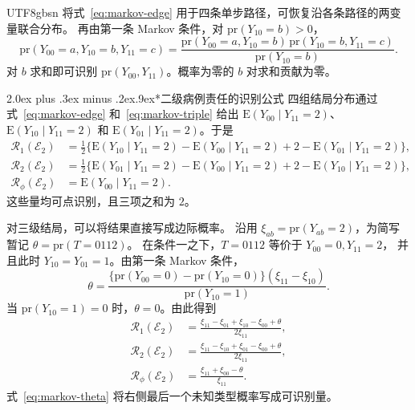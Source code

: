 \documentclass[11pt,a4paper]{article}
\makeatletter
\newcommand{\headingweight}{\ifPDFTeX\mdseries\else\bfseries\fi}
\renewcommand{\section}{\@startsection{section}{1}{0pt}
  {2.0ex plus .3ex minus .2ex}{.9ex}{\normalfont\large\headingweight}}
\makeatother
\begin{document}
\begin{CJK*}{UTF8}{gbsn}
将式~\eqref{eq:markov-edge} 用于四条单步路径，可恢复沿各条路径的两变量联合分布。
再由第一条 Markov 条件，对 $\mathrm{pr}(Y_{10}=b)>0$，
\begin{equation}
\mathrm{pr}(Y_{00}=a,Y_{10}=b,Y_{11}=c)
=
\frac{\mathrm{pr}(Y_{00}=a,Y_{10}=b)\,
      \mathrm{pr}(Y_{10}=b,Y_{11}=c)}
     {\mathrm{pr}(Y_{10}=b)} .
\label{eq:markov-triple}
\end{equation}
对 $b$ 求和即可识别 $\mathrm{pr}(Y_{00},Y_{11})$。概率为零的 $b$ 对求和贡献为零。

\clearpage
\section*{二级病例责任的识别公式}
四组结局分布通过式~\eqref{eq:markov-edge} 和~\eqref{eq:markov-triple} 给出
$\mathrm E(Y_{00}\mid Y_{11}=2)$、$\mathrm E(Y_{10}\mid Y_{11}=2)$ 和
$\mathrm E(Y_{01}\mid Y_{11}=2)$。于是
\begin{equation}
\begin{aligned}
\mathcal R_1(\mathcal E_2)
&=\tfrac12\{\mathrm E(Y_{10}\mid Y_{11}=2)-\mathrm E(Y_{00}\mid Y_{11}=2)
             +2-\mathrm E(Y_{01}\mid Y_{11}=2)\},\\
\mathcal R_2(\mathcal E_2)
&=\tfrac12\{\mathrm E(Y_{01}\mid Y_{11}=2)-\mathrm E(Y_{00}\mid Y_{11}=2)
             +2-\mathrm E(Y_{10}\mid Y_{11}=2)\},\\
\mathcal R_\phi(\mathcal E_2)
&=\mathrm E(Y_{00}\mid Y_{11}=2).
\end{aligned}
\label{eq:markov-two-means}
\end{equation}
这些量均可点识别，且三项之和为 $2$。

对三级结局，可以将结果直接写成边际概率。
沿用 $\xi_{ab}=\mathrm{pr}(Y_{ab}=2)$，为简写暂记
$\theta=\mathrm{pr}(T=0112)$。
在条件一之下，$T=0112$ 等价于 $Y_{00}=0,Y_{11}=2$，
并且此时 $Y_{10}=Y_{01}=1$。由第一条 Markov 条件，
\begin{equation}
\theta
=
\frac{\{\mathrm{pr}(Y_{00}=0)-\mathrm{pr}(Y_{10}=0)\}
      (\xi_{11}-\xi_{10})}
     {\mathrm{pr}(Y_{10}=1)} .
\label{eq:markov-theta}
\end{equation}
当 $\mathrm{pr}(Y_{10}=1)=0$ 时，$\theta=0$。由此得到
\begin{equation}
\begin{aligned}
\mathcal R_1(\mathcal E_2)
&=\frac{\xi_{11}-\xi_{01}+\xi_{10}-\xi_{00}+\theta}{2\xi_{11}},\\
\mathcal R_2(\mathcal E_2)
&=\frac{\xi_{11}-\xi_{10}+\xi_{01}-\xi_{00}+\theta}{2\xi_{11}},\\
\mathcal R_\phi(\mathcal E_2)
&=\frac{\xi_{11}+\xi_{00}-\theta}{\xi_{11}}.
\end{aligned}
\label{eq:markov-two-closed}
\end{equation}
式~\eqref{eq:markov-theta} 将右侧最后一个未知类型概率写成可识别量。


\end{CJK*}
\end{document}
